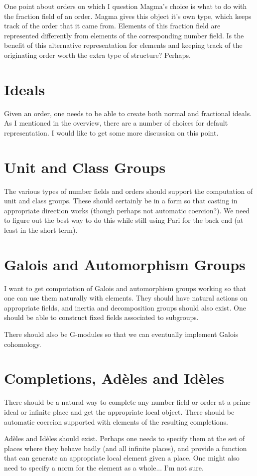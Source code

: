 \documentclass[12pt]{article}
\begin{document}
One point about orders on which I question Magma's choice is what to do with the fraction field of an order.  Magma gives this object it's own type, which keeps track of the order that it came from.  Elements of this fraction field are represented differently from elements of the corresponding number field.  Is the benefit of this alternative representation for elements and keeping track of the originating order worth the extra type of structure?  Perhaps.

\section{Ideals} \label{Ideals}

Given an order, one needs to be able to create both normal and fractional ideals.  As I mentioned in the overview, there are a number of choices for default representation.  I would like to get some more discussion on this point.

\section{Unit and Class Groups} \label{UC}
The various types of number fields and orders should support the computation of unit and class groups.  These should certainly be in a form so that casting in appropriate direction works (though perhaps not automatic coercion?).  We need to figure out the best way to do this while still using Pari for the back end (at least in the short term).

\section{Galois and Automorphism Groups} \label{Gal}
I want to get computation of Galois and automorphism groups working so that one can use them naturally with elements.  They should have natural actions on appropriate fields, and inertia and decomposition groups should also exist.  One should be able to construct fixed fields associated to subgroups.

There should also be G-modules so that we can eventually implement Galois cohomology.

\section{Completions, Ad\`{e}les and Id\`{e}les} \label{Comp}

There should be a natural way to complete any number field or order at a prime ideal or infinite place and get the appropriate local object.  There should be automatic coercion supported with elements of the resulting completions.

Ad\`{e}les and Id\`{e}les should exist.  Perhaps one needs to specify them at the set of places where they behave badly (and all infinite places), and provide a function that can generate an appropriate local element given a place.  One might also need to specify a norm for the element as a whole...  I'm not sure.
\end{document}
